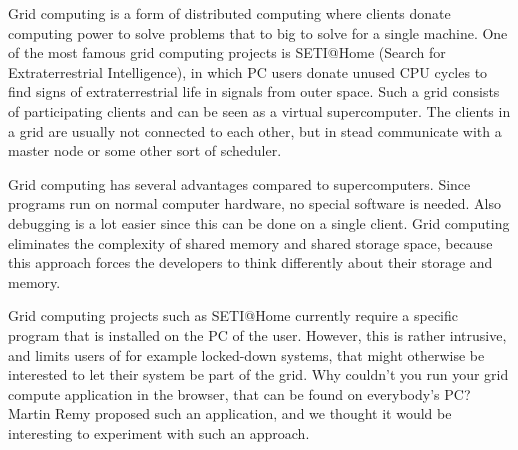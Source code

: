 Grid computing is a form of distributed computing where clients donate computing
power to solve problems that to big to solve for a single machine. One of the
most famous grid computing projects is SETI@Home (Search for Extraterrestrial
Intelligence), in which PC users donate unused CPU cycles to find signs of
extraterrestrial life in signals from outer space. Such a grid consists of
participating clients and can be seen as a virtual supercomputer. The clients in
a grid are usually not connected to each other, but in stead communicate with a
master node or some other sort of scheduler.
	
Grid computing has several advantages compared to supercomputers. Since programs
run on normal computer hardware, no special software is needed. Also debugging
is a lot easier since this can be done on a single client. Grid computing
eliminates the complexity of shared memory and shared storage space, because
this approach forces the developers to think differently about their storage and
memory.

Grid computing projects such as SETI@Home currently require a specific program
that is installed on the PC of the user. However, this is rather intrusive, and
limits users of for example locked-down systems, that might otherwise be
interested to let their system be part of the grid. Why couldn't you run your
grid compute application in the browser, that can be found on everybody's PC?
Martin Remy proposed \cite{CasualGridComp} such an application, and we thought
it would be interesting to experiment with such an approach.

